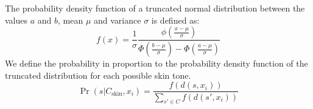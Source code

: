\\\\
The probability density function of a truncated normal distribution between the values $a$ and $b$, mean $\mu$ and variance $\sigma$ is defined as: 
\begin{equation*}
    f(x) = \frac{1}{\sigma}\frac{\phi(\frac{x-\mu}{\sigma})}{\Phi(\frac{b-\mu}{\sigma}) - \Phi(\frac{a-\mu}{\sigma})}
\end{equation*}
\noindent
We define the probability in proportion to the probability density function of the truncated distribution for each possible skin tone.
\begin{equation*}
    \Pr(s|C_\mathrm{skin}, x_i) = \frac{f(d(s,x_i))}{\sum_{s' \in C}f(d(s',x_i))}
\end{equation*}
\\\\

 

















